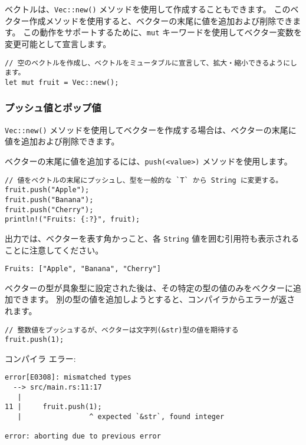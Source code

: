 ベクトルは、\texttt{Vec::new()} メソッドを使用して作成することもできます。 このベクター作成メソッドを使用すると、ベクターの末尾に値を追加および削除できます。 この動作をサポートするために、\texttt{mut} キーワードを使用してベクター変数を変更可能として宣言します。


\begin{lstlisting}[numbers=none]
// 空のベクトルを作成し、ベクトルをミュータブルに宣言して、拡大・縮小できるようにします。
let mut fruit = Vec::new();
\end{lstlisting}

\subsubsection{プッシュ値とポップ値}

\texttt{Vec::new()} メソッドを使用してベクターを作成する場合は、ベクターの末尾に値を追加および削除できます。

ベクターの末尾に値を追加するには、\texttt{push(<value>)} メソッドを使用します。

\begin{lstlisting}[numbers=none]
// 値をベクトルの末尾にプッシュし、型を一般的な `T` から String に変更する。
fruit.push("Apple");
fruit.push("Banana");
fruit.push("Cherry");
println!("Fruits: {:?}", fruit); 
\end{lstlisting}

出力では、ベクターを表す角かっこと、各 \texttt{String} 値を囲む引用符も表示されることに注意してください。

\begin{lstlisting}[numbers=none]
Fruits: ["Apple", "Banana", "Cherry"]
\end{lstlisting}

ベクターの型が具象型に設定された後は、その特定の型の値のみをベクターに追加できます。 別の型の値を追加しようとすると、コンパイラからエラーが返されます。

\begin{lstlisting}[numbers=none]
// 整数値をプッシュするが、ベクターは文字列(&str)型の値を期待する
fruit.push(1);
\end{lstlisting}

コンパイラ エラー:

\begin{lstlisting}[numbers=none]
error[E0308]: mismatched types
  --> src/main.rs:11:17
   |
11 |     fruit.push(1);
   |                ^ expected `&str`, found integer

error: aborting due to previous error
\end{lstlisting}

